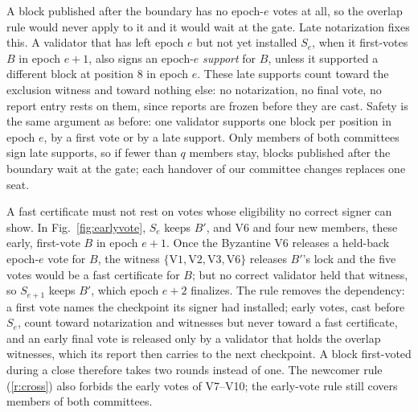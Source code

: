 A block published after the boundary has no epoch-$e$ votes at all, so the overlap rule would never apply to it and it would wait at the gate. Late notarization fixes this. A validator that has left epoch $e$ but not yet installed $S_e$, when it first-votes $B$ in epoch $e+1$, also signs an epoch-$e$ \emph{support} for $B$, unless it supported a different block at position 8 in epoch $e$. These late supports count toward the exclusion witness and toward nothing else: no notarization, no final vote, no report entry rests on them, since reports are frozen before they are cast. Safety is the same argument as before: one validator supports one block per position in epoch $e$, by a first vote or by a late support. Only members of both committees sign late supports, so if fewer than $q$ members stay, blocks published after the boundary wait at the gate; each handover of our committee changes replaces one seat.

A fast certificate must not rest on votes whose eligibility no correct signer can show. In Fig.~\ref{fig:earlyvote}, $S_e$ keeps $B'$, and V6 and four new members, these early, first-vote $B$ in epoch $e+1$. Once the Byzantine V6 releases a held-back epoch-$e$ vote for $B$, the witness $\{\text{V1},\text{V2},\text{V3},\text{V6}\}$ releases $B'$'s lock and the five votes would be a fast certificate for $B$; but no correct validator held that witness, so $S_{e+1}$ keeps $B'$, which epoch $e+2$ finalizes. The rule removes the dependency: a first vote names the checkpoint its signer had installed; early votes, cast before $S_e$, count toward notarization and witnesses but never toward a fast certificate, and an early final vote is released only by a validator that holds the overlap witnesses, which its report then carries to the next checkpoint. A block first-voted during a close therefore takes two rounds instead of one. The newcomer rule (\ref{r:cross}) also forbids the early votes of V7--V10; the early-vote rule still covers members of both committees.

